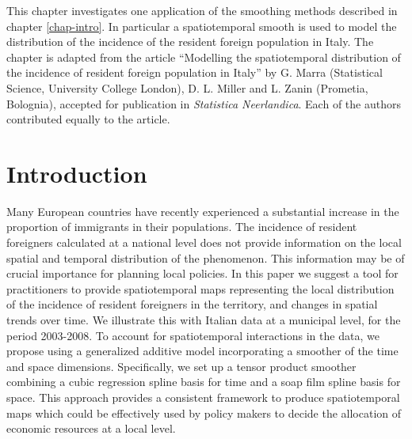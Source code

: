 \label{chap-it}

This chapter investigates one application of the smoothing methods described in chapter \ref{chap-intro}. In particular a spatiotemporal smooth is used to model the distribution of the incidence of the resident foreign population in Italy. The chapter is adapted from the article ``Modelling the spatiotemporal distribution of the incidence of resident foreign population in Italy'' by G. Marra (Statistical Science, University College London), D. L. Miller and L. Zanin (Prometia, Bolognia), accepted for publication in \textit{Statistica Neerlandica}. Each of the authors contributed equally to the article.

\section{Introduction \label{IN}}

Many European countries have recently experienced a substantial increase in the proportion of immigrants in their populations. The incidence of resident foreigners calculated at a national level does not provide information on the local spatial and temporal distribution of the phenomenon. This information may be of crucial importance for planning local policies. In this paper we suggest a tool for practitioners to provide spatiotemporal maps representing the local distribution of the incidence of resident foreigners in the territory, and changes in spatial trends over time. We illustrate this with Italian data at a municipal level, for the period 2003-2008. To account for spatiotemporal interactions in the data, we propose using a generalized additive model incorporating a smoother of the time and space dimensions. Specifically, we set up a tensor product smoother combining a cubic regression spline basis for time and a soap film spline basis for space. This approach provides a consistent framework to produce spatiotemporal maps which could be effectively used by policy makers to decide the allocation of economic resources at a local level.








